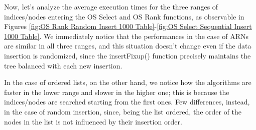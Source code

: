 \documentclass[11pt]{article}
\begin{document}
Now, let's analyze the average execution times for the three ranges of indices/nodes entering the OS Select and OS Rank functions, as observable in Figures \ref{fig:OS Rank Random Insert 1000 Table}-\ref{fig:OS Select Sequential Insert 1000 Table}. We immediately notice that the performances in the case of ARNs are similar in all three ranges, and this situation doesn't change even if the data insertion is randomized, since the insertFixup() function precisely maintains the tree balanced with each new insertion. 

In the case of ordered lists, on the other hand, we notice how the algorithms are faster in the lower range and slower in the higher one; this is because the indices/nodes are searched starting from the first ones. Few differences, instead, in the case of random insertion, since, being the list ordered, the order of the nodes in the list is not influenced by their insertion order.
\end{document}
